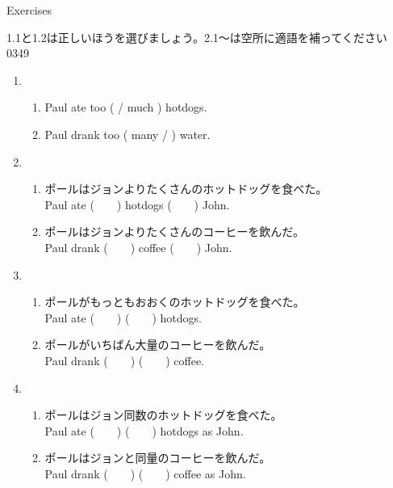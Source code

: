 \documentclass[aspectratio=169,xcolor={dvipsnames,table}]{beamer}
\begin{document}
\begin{frame}[plain]{Exercises}

{\small 1.1と1.2は正しいほうを選びましょう。2.1～は空所に適語を補ってください}%
\hfill{\tiny 0349}\,{\scriptsize {}}
 \begin{enumerate}
  \item \begin{enumerate}
	 \item<1-> Paul ate too (  / much ) hotdogs.
	 \item<1-> Paul drank too ( many / ) water.
	\end{enumerate}
  \item \begin{enumerate}
	 \item<1-> ポールはジョンよりたくさんのホットドッグを食べた。\\
	       Paul ate (~~~~) hotdogs (~~~~) John.
	 \item<1-> ポールはジョンよりたくさんのコーヒーを飲んだ。\\
	       Paul drank (~~~~) coffee (~~~~) John.
	\end{enumerate}
  \item \begin{enumerate}
	 \item<1-> ポールがもっともおおくのホットドッグを食べた。\\
	       Paul ate (~~~~) (~~~~) hotdogs.
	 \item<1-> ポールがいちばん大量のコーヒーを飲んだ。\\
	       Paul drank (~~~~) (~~~~) coffee.
	\end{enumerate}
  \item \begin{enumerate}
	 \item<1-> ポールはジョン同数のホットドッグを食べた。\\
	       Paul ate (~~~~) (~~~~) hotdogs as John.
	 \item<1-> ポールはジョンと同量のコーヒーを飲んだ。\\
	       Paul drank (~~~~) (~~~~) coffee as John.
	\end{enumerate}
 \end{enumerate}
\end{frame}
\end{document}
